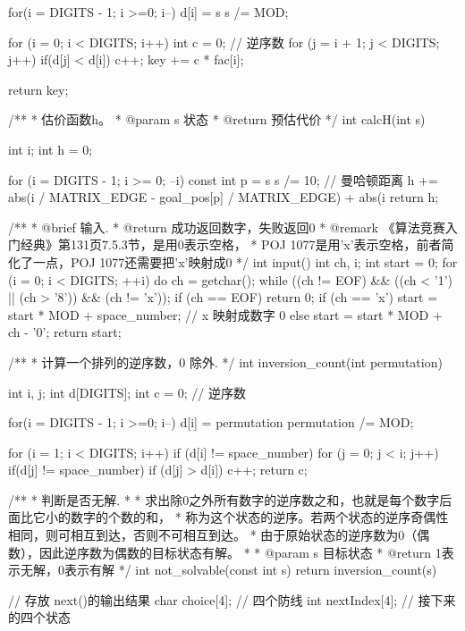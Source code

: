 \begin{Codex}[label=eight_digits_astar.c]
{    for(i = DIGITS - 1; i >=0; i--) {
        d[i] = s %
        s /= MOD;
    }
    
    for (i = 0; i < DIGITS; i++) {
        int c = 0; // 逆序数
        for (j = i + 1; j < DIGITS; j++) {
            if(d[j] < d[i]) {
                c++;
            }
        }
        key += c * fac[i];
    }
    
    return key;
}


/**
 * 估价函数h。
 * @param s 状态
 * @return 预估代价
 */
int calcH(int s) {
    int i;
    int h = 0;
    
    for (i = DIGITS - 1; i >= 0; --i) {
        const int p = s %
        s /= 10;
        // 曼哈顿距离
        h += abs(i / MATRIX_EDGE - goal_pos[p] / MATRIX_EDGE) +
            abs(i %
    }
    return h;
}

/**
 * @brief 输入.
 * @return  成功返回数字，失败返回0
 * @remark 《算法竞赛入门经典》第131页7.5.3节，是用0表示空格，
 * POJ 1077是用'x'表示空格，前者简化了一点，POJ 1077还需要把'x'映射成0
 */
int input() {
    int ch, i;
    int start = 0;
    for (i = 0; i < DIGITS; ++i) {
        do {
            ch = getchar();
        } while ((ch != EOF) && ((ch < '1') || (ch > '8')) && (ch != 'x'));
        if (ch == EOF) return 0;
        if (ch == 'x') start = start * MOD + space_number; // x 映射成数字 0
        else             start = start * MOD + ch - '0';
    }
    return start;
}

/**
 * 计算一个排列的逆序数，0 除外.
 */
int inversion_count(int permutation) {
    int i, j;
    int d[DIGITS];
    int c = 0; // 逆序数

    for(i = DIGITS - 1; i >=0; i--) {
        d[i] = permutation %
        permutation /= MOD;
    }
    
    for (i = 1; i < DIGITS; i++)  if (d[i] != space_number) {
        for (j = 0; j < i; j++) {
            if(d[j] != space_number) {
                if (d[j] > d[i]) {
                    c++;
                }
            }
        }
    }
    return c;
}

/**
 * 判断是否无解.
 *
 * 求出除0之外所有数字的逆序数之和，也就是每个数字后面比它小的数字的个数的和，
 * 称为这个状态的逆序。若两个状态的逆序奇偶性相同，则可相互到达，否则不可相互到达。
 * 由于原始状态的逆序数为0（偶数），因此逆序数为偶数的目标状态有解。
 *
 * @param s 目标状态
 * @return 1表示无解，0表示有解
 */
int not_solvable(const int s) {
    return inversion_count(s) %
}

// 存放 next()的输出结果
char choice[4]; // 四个防线
int nextIndex[4]; // 接下来的四个状态


\end{Codex}
